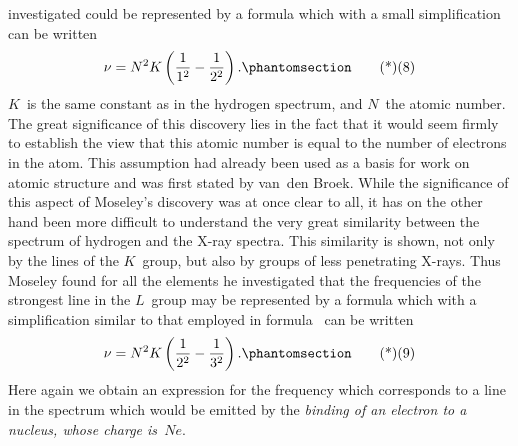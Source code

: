 investigated could be represented by a formula which with
a small simplification can be written
\[
\nu = N^{2} K \left(\frac{1}{1^{2}} - \frac{1}{2^{2}}\right).
\Tag{(8)}
\]
$K$~is the same constant as in the hydrogen spectrum, and $N$~the
atomic number. The great significance of this discovery lies in
the fact that it would seem firmly to establish the view that this
atomic number is equal to the number of electrons in the atom.
This assumption had already been used as a basis for work on
atomic structure and was first stated by van~den Broek. While
the significance of this aspect of Moseley's discovery was at once
clear to all, it has on the other hand been more difficult to understand
the very great similarity between the spectrum of hydrogen
and the X-ray spectra. This similarity is shown, not only by the
lines of the $K$~group, but also by groups of less penetrating X-rays.
Thus Moseley found for all the elements he investigated that the
frequencies of the strongest line in the $L$~group may be represented
by a formula which with a simplification similar to that employed
in formula~ can be written
\[
\nu = N^{2} K \left(\frac{1}{2^{2}} - \frac{1}{3^{2}}\right).
\Tag{(9)}
\]
Here again we obtain an expression for the frequency which corresponds
to a line in the spectrum which would be emitted by the
\emph{binding of an electron to a nucleus, whose charge is~$Ne$}.

